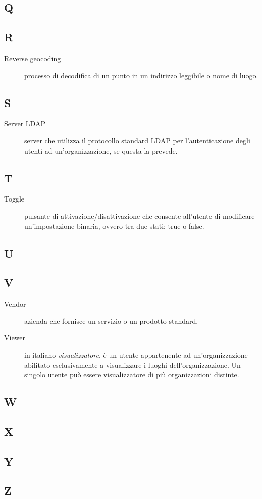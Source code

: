 \documentclass[../../../analisi-dei-requisiti.tex]{subfiles}
\begin{document}
\subsection{Q}

\subsection{R}
\begin{description}
    \item[Reverse geocoding] processo di decodifica di un punto in un indirizzo leggibile o nome di luogo.
\end{description}

\subsection{S}
\begin{description}
    \item[Server LDAP] server che utilizza il protocollo standard LDAP per l'autenticazione degli utenti ad un'organizzazione, se questa la prevede.
\end{description}

\subsection{T}
\begin{description}
  \item[Toggle] pulsante di attivazione/disattivazione che consente all'utente di modificare un'impostazione binaria, ovvero tra due stati: true o false.
\end{description}

\subsection{U}

\subsection{V}
\begin{description}
    \item[Vendor] azienda che fornisce un servizio o un prodotto standard.
    \item[Viewer] in italiano \textit{visualizzatore}, è un utente appartenente ad un'organizzazione abilitato esclusivamente a visualizzare i luoghi dell'organizzazione. Un singolo utente può essere visualizzatore di più organizzazioni distinte.
\end{description}

\subsection{W}

\subsection{X}

\subsection{Y}

\subsection{Z}
\end{document}
